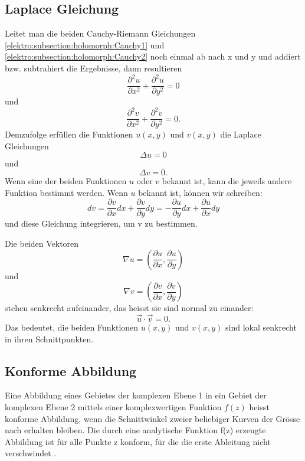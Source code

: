 \subsection{Laplace Gleichung
	\label{elektro:subsection:Laplace}}
Leitet man die beiden Cauchy-Riemann Gleichungen \eqref{elektro:subsection:holomorph:Cauchy1} und \eqref{elektro:subsection:holomorph:Cauchy2} noch einmal ab nach x und y und addiert bzw. subtrahiert die Ergebnisse, dann resultieren
\begin{equation}
	\frac{\partial^{2}u}{\partial x^{2}} + \frac{\partial^{2}u}{\partial y^{2}} = 0
\end{equation}
und 
\begin{equation}
	\frac{\partial^{2}v}{\partial x^{2}} + \frac{\partial^{2}v}{\partial y^{2}} = 0.
\end{equation}
Demzufolge erfüllen die Funktionen $u(x,y)$ und $v(x,y)$ die Laplace Gleichungen
\begin{equation}
	\Delta u = 0
\end{equation}
und 
\begin{equation}
	\Delta v = 0.
\end{equation}
Wenn eine der beiden Funktionen $u$ oder $v$ bekannt ist, kann die jeweils andere Funktion bestimmt werden.
Wenn $u$ bekannt ist, können wir schreiben:
\begin{equation}
	dv = \frac{\partial v}{\partial x}dx + \frac{\partial v}{\partial y} dy = 
	-\frac{\partial u}{\partial y}dx + \frac{\partial u}{\partial x}dy
\end{equation}
und diese Gleichung integrieren, um v zu bestimmen.

Die beiden Vektoren
\begin{equation}
	\nabla{u} = \left(\frac{\partial u}{\partial x}, \frac{\partial u}{\partial y} \right)
\end{equation}
und 
\begin{equation}
	\nabla{v} = \left(\frac{\partial v}{\partial x}, \frac{\partial v}{\partial y} \right)
\end{equation}
stehen senkrecht aufeinander, das heisst sie sind normal zu einander:
\begin{equation}
	\vec{u} \cdot \vec{v} = 0.
\end{equation}
Das bedeutet, die beiden Funktionen $u(x,y)$ und $v(x,y)$ sind lokal senkrecht in ihren Schnittpunkten.

\subsection{Konforme Abbildung
	\label{elektro:subsection:KonformeAbb}}
Eine Abbildung eines Gebietes der komplexen Ebene 1 in ein Gebiet der komplexen Ebene 2 mittels einer komplexwertigen Funktion $f(z)$ heisst konforme Abbildung, wenn die Schnittwinkel zweier beliebiger Kurven der Grösse nach erhalten bleiben. Die durch eine analytische Funktion f(z) erzeugte Abbildung ist für alle Punkte z konform, für die die erste Ableitung nicht verschwindet \cite{elektro:mathematik-alpha}.

